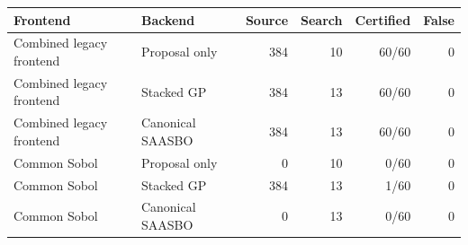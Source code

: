 \begin{tabular}{llrrrr}
\toprule
Frontend & Backend & Source & Search & Certified & False \\
\midrule
Combined legacy frontend & Proposal only & 384 & 10 & 60/60 & 0 \\
Combined legacy frontend & Stacked GP & 384 & 13 & 60/60 & 0 \\
Combined legacy frontend & Canonical SAASBO & 384 & 13 & 60/60 & 0 \\
Common Sobol & Proposal only & 0 & 10 & 0/60 & 0 \\
Common Sobol & Stacked GP & 384 & 13 & 1/60 & 0 \\
Common Sobol & Canonical SAASBO & 0 & 13 & 0/60 & 0 \\
\bottomrule
\end{tabular}
